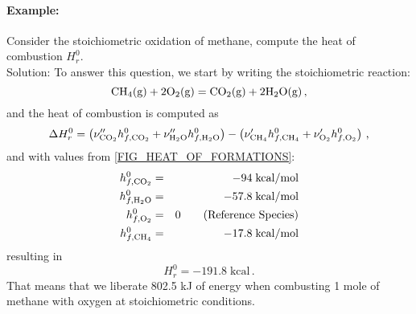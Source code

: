 \paragraph*{Example:} Consider the stoichiometric oxidation of methane, compute the heat of combustion $H^0_r.$
\\
Solution: To answer this question, we start by writing the stoichiometric reaction:
\[
  \mathrm{CH_4} (\text{g}) + 2 \mathrm{O_2} (\text{g}) = \mathrm{CO_2} (\text{g}) + 2\mathrm{H_2O} (\text{g}) \, \text{,}
\]
and the heat of combustion is computed as
\begin{equation}
  \Delta H^0_r =\left(\nu''_{\mathrm{CO_2}}  {h}^0_{f,\mathrm{CO_2}} + \nu''_{\mathrm{H_2O}}  {h}^0_{f,\mathrm{H_2O}}\right) - 
                 \left(\nu'_{\mathrm{CH_4}}  {h}^0_{f,\mathrm{CH_4}} + \nu'_{\mathrm{O_2}}  {h}^0_{f,\mathrm{O_2}}\right) \, \text{,}
\end{equation}
and with values from \cref{FIG_HEAT_OF_FORMATIONS}:
\begin{eqnarray*}
  {h}^0_{f,\mathrm{CO_2}} &=& -94\; \text{kcal/mol}\\
  {h}^0_{f,\mathrm{H_2O}} &=& -57.8\; \text{kcal/mol}\\
  {h}^0_{f,\mathrm{O_2}} &=&  0\qquad\text{(Reference Species)}\\
  {h}^0_{f,\mathrm{CH_4}} &=& -17.8\; \text{kcal/mol}\\
\end{eqnarray*}
resulting in
\begin{equation}
  \label{HEAT_OF_COMB_CH4_O2}
  H^0_r = -191.8\;\text{kcal} \, \text{.}
\end{equation}
That means that we liberate 802.5 kJ of energy when combusting 1 mole of methane with oxygen at stoichiometric conditions.

